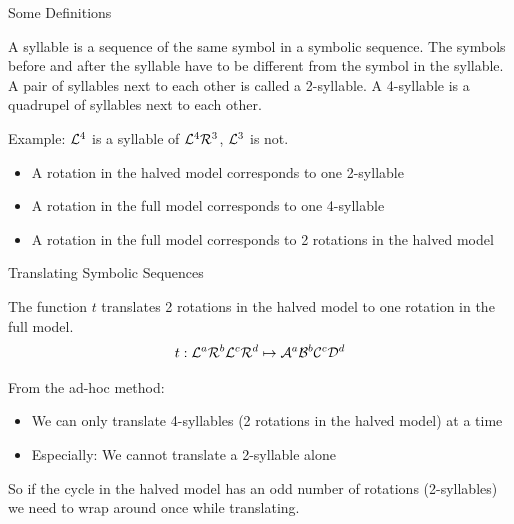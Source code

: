 \begin{frame}{Some Definitions}
	\vspace{-1em}
	\begin{definition}[Syllables]
		A syllable is a sequence of the same symbol in a symbolic sequence.
		The symbols before and after the syllable have to be different from the symbol in the syllable. \\[1em]
		A pair of syllables next to each other is called a 2-syllable.
		A 4-syllable is a quadrupel of syllables next to each other.
	\end{definition}
	\pause
	Example: $\mathcal{L}^4$ is a syllable of $\mathcal{L}^4\mathcal{R}^3$, $\mathcal{L}^3$ is not.
	\vspace{1em}
	\begin{itemize}
		\pause
		\item A rotation in the halved model corresponds to one 2-syllable \pause
		\item A rotation in the full model corresponds to one 4-syllable \pause
		\item A rotation in the full model corresponds to 2 rotations in the halved model
	\end{itemize}
\end{frame}

\begin{frame}{Translating Symbolic Sequences}
	\begin{definition}
		The function $t$ translates 2 rotations in the halved model to one rotation in the full model.
		\begin{align*}
			t: \mathcal{L}^a\mathcal{R}^b\mathcal{L}^c\mathcal{R}^d \mapsto \mathcal{A}^a\mathcal{B}^b\mathcal{C}^c\mathcal{D}^d
		\end{align*}
	\end{definition}

	\pause
	From the ad-hoc method:
	\pause
	\begin{itemize}
		\item We can only translate 4-syllables (2 rotations in the halved model) at a time \pause
		\item Especially: We cannot translate a 2-syllable alone
	\end{itemize}
	\pause
	So if the cycle in the halved model has an odd number of rotations (2-syllables) we need to wrap around once while translating.
\end{frame}

